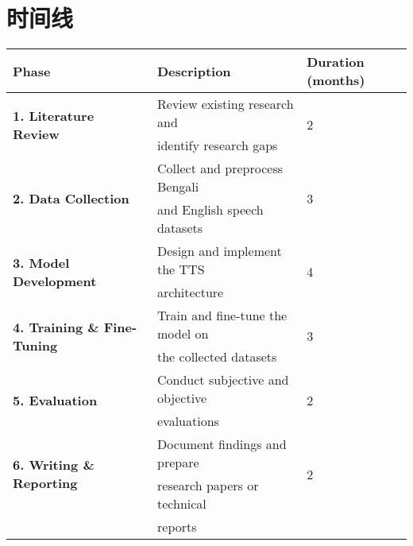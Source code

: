 \section*{时间线}

\begin{table}[h!]
    \centering
    \begin{tabular}{lll}


    \toprule
    \textbf{Phase} & \textbf{Description} & \textbf{Duration (months)} \\
    \midrule
    \multirow{2}{*}{\textbf{1. Literature Review}} & Review existing research and & \multirow{2}{*}{2} \\
     & identify research gaps &  \\
     
    
     \midrule
    \multirow{2}{*}{\textbf{2. Data Collection}} & Collect and preprocess Bengali & \multirow{2}{*}{3} \\
     & and English speech datasets & \\
    
     \midrule
    \multirow{2}{*}{\textbf{3. Model Development}} & Design and implement the TTS & \multirow{2}{*}{4} \\
     & architecture &  \\

    \midrule
    \multirow{2}{*}{\textbf{4. Training \& Fine-Tuning}} & Train and fine-tune the model on & \multirow{2}{*}{3} \\
     & the collected datasets & \\
    
    \midrule
    \multirow{2}{*}{\textbf{5. Evaluation}} & Conduct subjective and objective & \multirow{2}{*}{2} \\
     & evaluations & \\
    
    \midrule
    \multirow{2}{*}{\textbf{6. Writing \& Reporting}} & Document findings and prepare & \multirow{2}{*}{2} \\
     & research papers or technical & \\
     & reports & \\
    \bottomrule
    \end{tabular}
\end{table}
